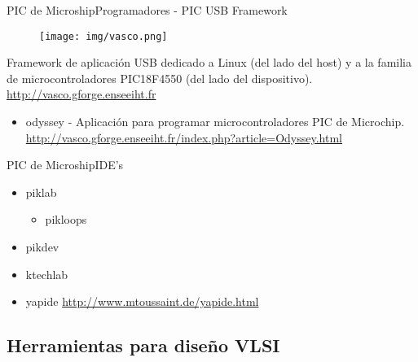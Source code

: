 \documentclass{beamer}
\begin{document}
\begin{frame}{PIC de Microship}{Programadores - PIC USB Framework}
  \begin{figure}[!h]
    \centering
    \texttt{[image: img/vasco.png]}
  \end{figure}
  Framework de aplicación USB dedicado a Linux (del lado del host) y a la familia de microcontroladores PIC18F4550 (del lado del dispositivo). \url{http://vasco.gforge.enseeiht.fr}
  \begin{itemize}
  \item \alert{odyssey} - Aplicación para programar microcontroladores PIC de Microchip. \url{http://vasco.gforge.enseeiht.fr/index.php?article=Odyssey.html} 
  \end{itemize}
\end{frame}

\begin{frame}{PIC de Microship}{IDE's}
  \begin{itemize}
  \item piklab
    \begin{itemize}
    \item pikloops
    \end{itemize}
  \item pikdev
  \item ktechlab
  \item yapide \url{http://www.mtoussaint.de/yapide.html}
  \end{itemize}
\end{frame}

\subsection[Diseño VLSI]{Herramientas para diseño VLSI}


\end{document}
